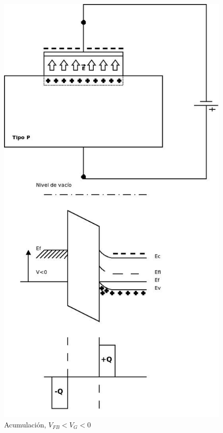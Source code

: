 \documentclass[oneside]{book}
\numberwithin{equation}{section}
\numberwithin{figure}{section}
\numberwithin{table}{section}
\begin{document}
				\begin{minipage}[t]{0.4\textwidth}		
					\begin{figure}[H]
						\begin{center}
							\includegraphics[scale=0.4]{MOS-Acum.jpeg}
							\caption{Acumulación, $V_{FB}<V_G<0$}
						\end{center}
					\end{figure}	
				\end{minipage}
				
\end{document}
